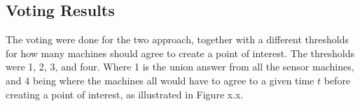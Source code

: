 \subsection{Voting Results}
The voting were done for the two approach, together with a different thresholds for how many machines should agree to create a point of interest.
The thresholds were 1, 2, 3, and four. Where 1 is the union answer from all the sensor machines, and 4 being where the machines all would have to agree to a given time $t$ before creating a point of interest, as illustrated in Figure x.x.







